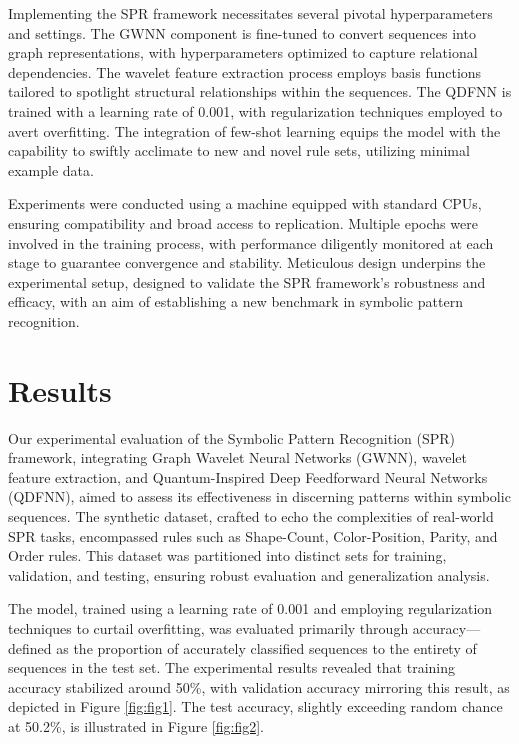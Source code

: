 \documentclass{article}
\begin{document}
Implementing the SPR framework necessitates several pivotal hyperparameters and settings. The GWNN component is fine-tuned to convert sequences into graph representations, with hyperparameters optimized to capture relational dependencies. The wavelet feature extraction process employs basis functions tailored to spotlight structural relationships within the sequences. The QDFNN is trained with a learning rate of 0.001, with regularization techniques employed to avert overfitting. The integration of few-shot learning equips the model with the capability to swiftly acclimate to new and novel rule sets, utilizing minimal example data.

Experiments were conducted using a machine equipped with standard CPUs, ensuring compatibility and broad access to replication. Multiple epochs were involved in the training process, with performance diligently monitored at each stage to guarantee convergence and stability. Meticulous design underpins the experimental setup, designed to validate the SPR framework's robustness and efficacy, with an aim of establishing a new benchmark in symbolic pattern recognition.

\section{Results}

Our experimental evaluation of the Symbolic Pattern Recognition (SPR) framework, integrating Graph Wavelet Neural Networks (GWNN), wavelet feature extraction, and Quantum-Inspired Deep Feedforward Neural Networks (QDFNN), aimed to assess its effectiveness in discerning patterns within symbolic sequences. The synthetic dataset, crafted to echo the complexities of real-world SPR tasks, encompassed rules such as Shape-Count, Color-Position, Parity, and Order rules. This dataset was partitioned into distinct sets for training, validation, and testing, ensuring robust evaluation and generalization analysis.

The model, trained using a learning rate of 0.001 and employing regularization techniques to curtail overfitting, was evaluated primarily through accuracy—defined as the proportion of accurately classified sequences to the entirety of sequences in the test set. The experimental results revealed that training accuracy stabilized around 50\%, with validation accuracy mirroring this result, as depicted in Figure \ref{fig:fig1}. The test accuracy, slightly exceeding random chance at 50.2\%, is illustrated in Figure \ref{fig:fig2}.
\end{document}
